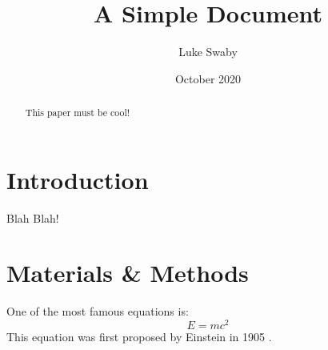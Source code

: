 \documentclass[12pt]{article}
\title{A Simple Document}
\author{Luke Swaby}
\date{October 2020}
\begin{document}
\maketitle
  
\begin{abstract}
This paper must be cool!
\end{abstract}
  
\section{Introduction}
Blah Blah!
  
\section{Materials \& Methods}
One of the most famous equations is:
\begin{equation}
E = mc^2
\end{equation}
This equation was first proposed by Einstein in 1905 
\cite{einstein1905does}.
  


\end{document}
